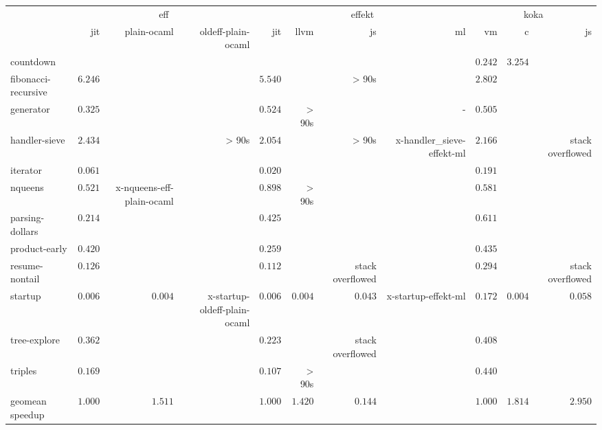 \begin{tabular}{l r r r r r r r r r r}
\toprule & \multicolumn{3}{c}{eff} & \multicolumn{4}{c}{effekt} & \multicolumn{3}{c}{koka} \\
\cmidrule(l){2-4}\cmidrule(l){5-8}\cmidrule(l){9-11} 
 & jit & plain-ocaml & oldeff-plain-ocaml & jit & llvm & js & ml & vm & c & js \\
\midrule
countdown &  &  &  &  &  &  &  & $\mathbf{0.242}$ & $3.254$ &  \\
fibonacci-recursive & $6.246$ &  &  & $5.540$ &  & > 90s &  & $\mathbf{2.802}$ &  &  \\
generator & $\mathbf{0.325}$ &  &  & $0.524$ & > 90s &  & - & $0.505$ &  &  \\
handler-sieve & $2.434$ &  & > 90s & $\mathbf{2.054}$ &  & > 90s & x-handler_sieve-effekt-ml & $2.166$ &  & stack overflowed \\
iterator & $0.061$ &  &  & $\mathbf{0.020}$ &  &  &  & $0.191$ &  &  \\
nqueens & $\mathbf{0.521}$ & x-nqueens-eff-plain-ocaml &  & $0.898$ & > 90s &  &  & $0.581$ &  &  \\
parsing-dollars & $\mathbf{0.214}$ &  &  & $0.425$ &  &  &  & $0.611$ &  &  \\
product-early & $0.420$ &  &  & $\mathbf{0.259}$ &  &  &  & $0.435$ &  &  \\
resume-nontail & $0.126$ &  &  & $\mathbf{0.112}$ &  & stack overflowed &  & $0.294$ &  & stack overflowed \\
startup & $0.006$ & $0.004$ & x-startup-oldeff-plain-ocaml & $0.006$ & $0.004$ & $0.043$ & x-startup-effekt-ml & $0.172$ & $\mathbf{0.004}$ & $0.058$ \\
tree-explore & $0.362$ &  &  & $\mathbf{0.223}$ &  & stack overflowed &  & $0.408$ &  &  \\
triples & $0.169$ &  &  & $\mathbf{0.107}$ & > 90s &  &  & $0.440$ &  &  \\
\midrule
 geomean speedup & $1.000$ & $1.511$ &  & $1.000$ & $1.420$ & $0.144$ &  & $1.000$ & $1.814$ & $2.950$ \\
\bottomrule
\end{tabular}